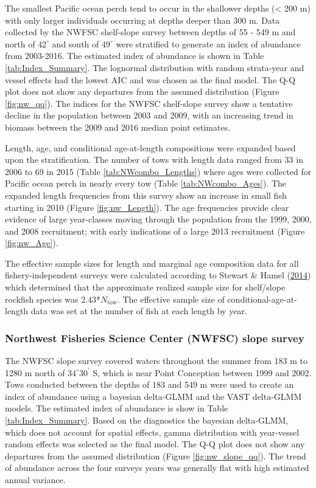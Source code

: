 \documentclass[12pt,]{article}
\begin{document}
The smallest Pacific ocean perch tend to occur in the shallower depths
(\textless{} 200 m) with only larger individuals occurring at depths
deeper than 300 m. Data collected by the NWFSC shelf-slope survey
between depths of 55 - 549 m and north of \(42^\circ\) and south of
\(49^\circ\) were stratified to generate an index of abundance from
2003-2016. The estimated index of abundance is shown in Table
\ref{tab:Index_Summary}. The lognormal distribution with random
strata-year and vessel effects had the lowest AIC and was chosen as the
final model. The Q-Q plot does not show any departures from the assumed
distribution (Figure \ref{fig:nw_qq}). The indices for the NWFSC
shelf-slope survey show a tentative decline in the population between
2003 and 2009, with an increasing trend in biomass between the 2009 and
2016 median point estimates.

Length, age, and conditional age-at-length compositions were expanded
based upon the stratification. The number of tows with length data
ranged from 33 in 2006 to 69 in 2015 (Table \ref{tab:NWcombo_Lengths})
where ages were collected for Pacific ocean perch in nearly every tow
(Table \ref{tab:NWcombo_Ages}). The expanded length frequencies from
this survey show an increase in small fish starting in 2010 (Figure
\ref{fig:nw_Length}). The age frequencies provide clear evidence of
large year-classes moving through the population from the 1999, 2000,
and 2008 recruitment; with early indications of a large 2013 recruitment
(Figure \ref{fig:nw_Age}).

The effective sample sizes for length and marginal age composition data
for all fishery-independent surveys were calculated according to Stewart
\& Hamel (\protect\hyperlink{ref-stewart_bootstrapping_2014}{2014})
which determined that the approximate realized sample size for
shelf/slope rockfish species was 2.43*\(N_{\text{tow}}\). The effective
sample size of conditional-age-at-length data was set at the number of
fish at each length by year.

\subsubsection{Northwest Fisheries Science Center (NWFSC) slope
survey}\label{northwest-fisheries-science-center-nwfsc-slope-survey}

The NWFSC slope survey covered waters throughout the summer from 183 m
to 1280 m north of \(34^\circ 30^\prime\) S, which is near Point
Conception between 1999 and 2002. Tows conducted between the depths of
183 and 549 m were used to create an index of abundance using a bayesian
delta-GLMM and the VAST delta-GLMM models. The estimated index of
abundance is show in Table \ref{tab:Index_Summary}. Based on the
diagnostics the bayesian delta-GLMM, which does not account for spatial
effects, gamma distribution with year-vessel random effects was selected
as the final model. The Q-Q plot does not show any departures from the
assumed distribution (Figure \ref{fig:nw_slope_qq}). The trend of
abundance across the four surveys years was generally flat with high
estimated annual variance.
\end{document}
